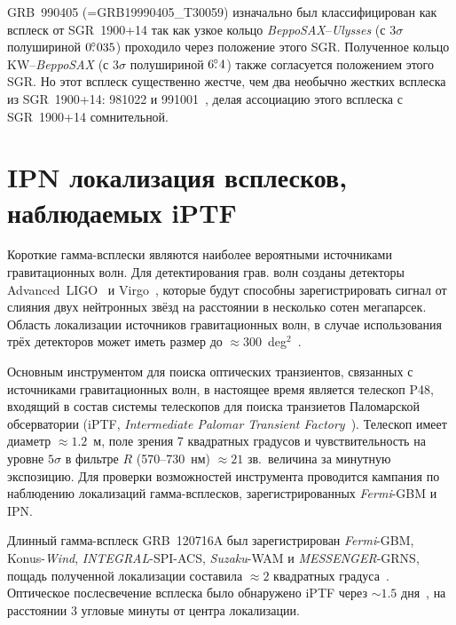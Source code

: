 GRB~990405 (=GRB19990405\_T30059) изначально был классифицирован как всплеск
от SGR~1900+14 так как узкое кольцо \textit{BeppoSAX}--\textit{Ulysses} 
(с $3\sigma$ полушириной $0\mbox{$.\!\!^\circ$}035$) проходило через положение 
этого SGR. Полученное кольцо KW--\textit{BeppoSAX} (с $3\sigma$ полушириной
$6\mbox{$.\!\!^\circ$}4$) также согласуется положением этого SGR. Но этот всплеск 
существенно жестче, чем два необычно жестких всплеска из SGR~1900+14: 
981022 и 991001~\citep{Woods_1999ApJ}, делая ассоциацию этого всплеска 
с SGR~1900+14 сомнительной.
\FloatBarrier

\section{IPN локализация всплесков, наблюдаемых iPTF}
Короткие гамма-всплески являются наиболее вероятными источниками гравитационных
волн. Для детектирования грав. волн созданы детекторы  Advanced~LIGO~\citep{Harry_2010CQGra} 
и Virgo~\citep{Accadia_2012JInst}, которые будут способны зарегистрировать сигнал от слияния
двух нейтронных звёзд на расстоянии в несколько сотен мегапарсек.
Область локализации источников гравитационных волн, в случае использования 
трёх детекторов может иметь размер до $\approx 300$~deg$^2$~\citep{Singer_2015PhDT}.

Основным инструментом для поиска оптических транзиентов, связанных с источниками 
гравитационных волн, в настоящее время является телескоп P48, входящий в состав 
системы телескопов для поиска транзиетов Паломарской обсерватории
(iPTF, \textit{Intermediate Palomar Transient Factory}~\citep{Rau_2009PASP}). 
Телескоп имеет диаметр $\approx 1.2$~м, поле зрения 7 квадратных градусов и 
чувствительность на уровне $5\sigma$ в фильтре $R$ (570--730~нм) $\approx 21$ зв.~величина за минутную экспозицию.
Для проверки возможностей инструмента проводится кампания по наблюдению локализаций
гамма-всплесков, зарегистрированных \textit{Fermi}-GBM и IPN.

Длинный гамма-всплеск GRB~120716A был зарегистрирован  \textit{Fermi}-GBM, Konus-\textit{Wind}, 
\textit{INTEGRAL}-SPI-ACS, \textit{Suzaku}-WAM и \textit{MESSENGER}-GRNS,
пощадь полученной локализации  составила $\approx 2$ квадратных градуса~\citep{Hurley_2012GCN13487}.
Оптическое послесвечение всплеска было обнаружено iPTF 
через $\sim 1.5$ дня~\citep{Cenko_2012GCN13489}, на расстоянии 3 угловые минуты от центра локализации.

